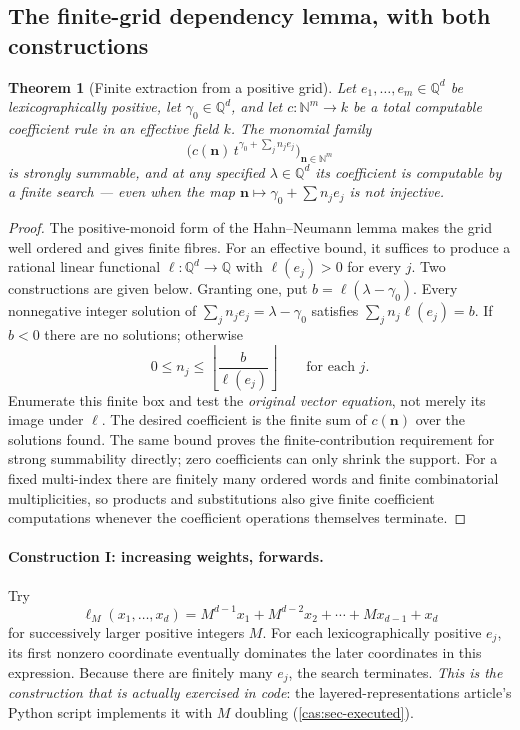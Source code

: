 \documentclass[11pt,letterpaper]{article}
\numberwithin{equation}{section}
\newtheorem{theorem}{Theorem}[section]
\theoremstyle{definition}
\theoremstyle{remark}
\newcommand{\Q}{\mathbb Q}
\newcommand{\N}{\mathbb N}
\begin{document}
\subsection{The finite-grid dependency lemma, with both constructions}
\label{cas:sub-gridlemma}
\begin{theorem}[Finite extraction from a positive grid]\label{cas:thm-grid}
Let $e_1,\dots,e_m\in\Q^d$ be lexicographically positive, let
$\gamma_0\in\Q^d$, and let $c:\N^m\to k$ be a total computable coefficient rule
in an effective field $k$. The monomial family
\begin{equation}\label{cas:eq-gridseries}
 \bigl(c(\boldsymbol n)\,t^{\gamma_0+\sum_jn_je_j}\bigr)_{\boldsymbol n\in\N^m}
\end{equation}
is strongly summable, and at any specified $\lambda\in\Q^d$ its coefficient is
computable by a finite search --- even when the map
$\boldsymbol n\mapsto\gamma_0+\sum n_je_j$ is not injective.
\end{theorem}
\begin{proof}
The positive-monoid form of the Hahn--Neumann lemma makes the grid well ordered
and gives finite fibres. For an effective bound, it suffices to produce a
rational linear functional $\ell:\Q^d\to\Q$ with $\ell(e_j)>0$ for every $j$.
Two constructions are given below. Granting one, put $b=\ell(\lambda-\gamma_0)$.
Every nonnegative integer solution of $\sum_jn_je_j=\lambda-\gamma_0$ satisfies
$\sum_jn_j\ell(e_j)=b$. If $b<0$ there are no solutions; otherwise
\[
 0\le n_j\le\left\lfloor\frac{b}{\ell(e_j)}\right\rfloor
 \qquad\text{for each }j.
\]
Enumerate this finite box and test the \emph{original vector equation}, not
merely its image under $\ell$. The desired coefficient is the finite sum of
$c(\boldsymbol n)$ over the solutions found. The same bound proves the
finite-contribution requirement for strong summability directly; zero
coefficients can only shrink the support. For a fixed multi-index there are
finitely many ordered words and finite combinatorial multiplicities, so products
and substitutions also give finite coefficient computations whenever the
coefficient operations themselves terminate.
\end{proof}

\paragraph{Construction I: increasing weights, forwards.}
Try
\[
 \ell_M(x_1,\dots,x_d)=M^{d-1}x_1+M^{d-2}x_2+\cdots+Mx_{d-1}+x_d
\]
for successively larger positive integers $M$. For each lexicographically
positive $e_j$, its first nonzero coordinate eventually dominates the later
coordinates in this expression. Because there are finitely many $e_j$, the
search terminates. \emph{This is the construction that is actually exercised in
code}: the layered-representations article's Python script implements it with
$M$ doubling (\cref{cas:sec-executed}).
\end{document}

